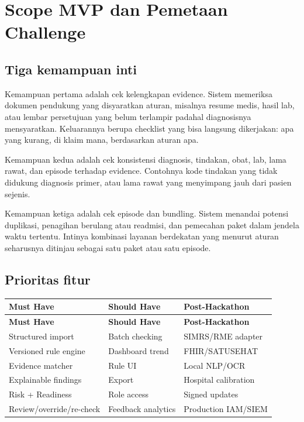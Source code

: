 \documentclass[11pt,a4paper]{article}
\begin{document}
\section{Scope MVP dan Pemetaan Challenge}
\subsection{Tiga kemampuan inti}
Kemampuan pertama adalah cek kelengkapan evidence. Sistem memeriksa dokumen pendukung yang disyaratkan aturan, misalnya resume medis, hasil lab, atau lembar persetujuan yang belum terlampir padahal diagnosisnya mensyaratkan. Keluarannya berupa checklist yang bisa langsung dikerjakan: apa yang kurang, di klaim mana, berdasarkan aturan apa.

Kemampuan kedua adalah cek konsistensi diagnosis, tindakan, obat, lab, lama rawat, dan episode terhadap evidence. Contohnya kode tindakan yang tidak didukung diagnosis primer, atau lama rawat yang menyimpang jauh dari pasien sejenis.

Kemampuan ketiga adalah cek episode dan bundling. Sistem menandai potensi duplikasi, penagihan berulang atau readmisi, dan pemecahan paket dalam jendela waktu tertentu. Intinya kombinasi layanan berdekatan yang menurut aturan seharusnya ditinjau sebagai satu paket atau satu episode.

\subsection{Prioritas fitur}
\begin{longtable}{|p{5cm}|p{5cm}|p{5cm}|}
\hline
\rowcolor{blue!15} \textbf{Must Have} & \textbf{Should Have} & \textbf{Post-Hackathon} \\ \hline
\endfirsthead
\hline
\rowcolor{blue!15} \textbf{Must Have} & \textbf{Should Have} & \textbf{Post-Hackathon} \\ \hline
\endhead
Structured import & Batch checking & SIMRS/RME adapter \\ \hline
Versioned rule engine & Dashboard trend & FHIR/SATUSEHAT \\ \hline
Evidence matcher & Rule UI & Local NLP/OCR \\ \hline
Explainable findings & Export & Hospital calibration \\ \hline
Risk + Readiness & Role access & Signed updates \\ \hline
Review/override/re-check & Feedback analytics & Production IAM/SIEM \\ \hline
\end{longtable}
\end{document}

